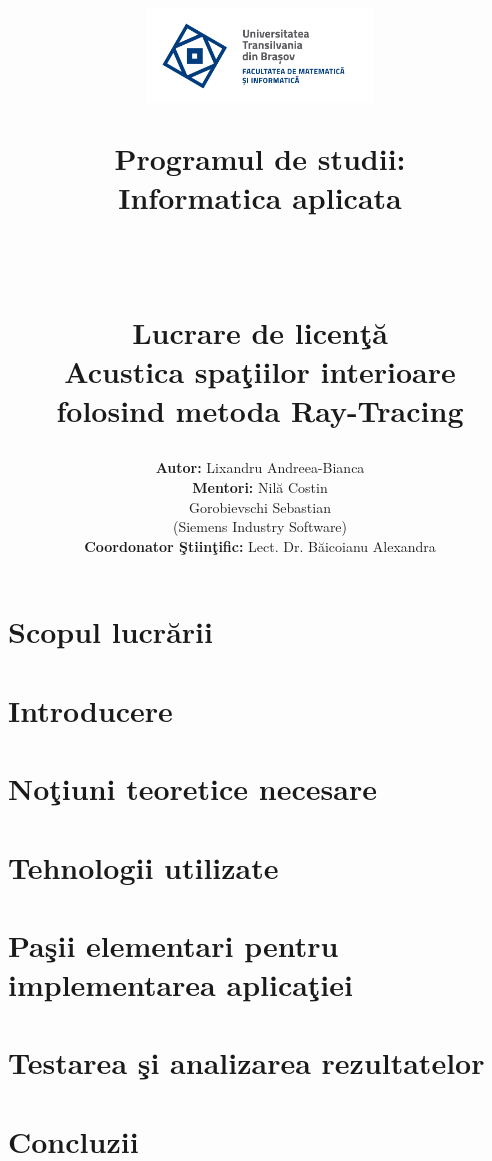 \documentclass[12pt, a4paper]{report} %
\title{\begin{minipage} {0.3\textwidth}
		{{\includegraphics[width=6cm]{imagini/sigla.png} }}%
	\end{minipage}
	\hfill
	\begin{minipage}{0.3\textwidth}
		\fontsize{10pt}{6pt}\selectfont
			Programul de studii:\\
			Informatica aplicata\\
	\end{minipage}
	\vspace*{7\baselineskip}\\
	\begin{center}
			\fontsize{22pt}{6pt}\selectfont
		\bf Lucrare de licen\c{t}\u{a}\\
		\vspace{5mm}
		Acustica spa\c{t}iilor interioare folosind metoda Ray-Tracing
		\vspace*{30\baselineskip}
	\end{center}
	}
\author{\fontsize{15pt}{6pt}\selectfont
	{\bf Autor:} \hspace{5.1cm}Lixandru Andreea-Bianca\\
	\vspace{3mm}
	{\bf Mentori:} \hspace{4.6cm}Nil\u{a} Costin\\
	\vspace{3mm}
	\hspace{7cm}Gorobievschi Sebastian\\
	\vspace{3mm}
	\hspace{7cm}(Siemens Industry Software)\\
	\vspace{3mm}
	{\bf Coordonator \c{S}tiin\c{t}ific:} \hspace{1cm}Lect. Dr. B\u{a}icoianu Alexandra}
\date{\begin{center} Bra\c{s}ov, 2021 \end{center}}
\makeatletter
\renewcommand{\maketitle}{\bgroup\setlength{\parindent}{0pt}
	\begin{flushleft}
		\textbf{\@title}
		
		\@author
		
		\vspace{10mm}
		\@date
	\end{flushleft}\egroup
}
\makeatother
\begin{document}
	
	\maketitle	
	\thispagestyle{empty} %
	
	\newpage
	\tableofcontents
	\thispagestyle{empty}

		
	
	\chapter*{Scopul lucr\u arii}
		
		
	\chapter*{Introducere}
		
	\chapter{No\c{t}iuni teoretice necesare}
		
	\chapter{Tehnologii utilizate}
		
	\chapter{Pa\c{s}ii elementari pentru implementarea aplica\c{t}iei}
			
	\chapter{Testarea \c{s}i analizarea rezultatelor}
		
	\chapter{Concluzii}
		
	
	
	\newpage
	
\end{document}
